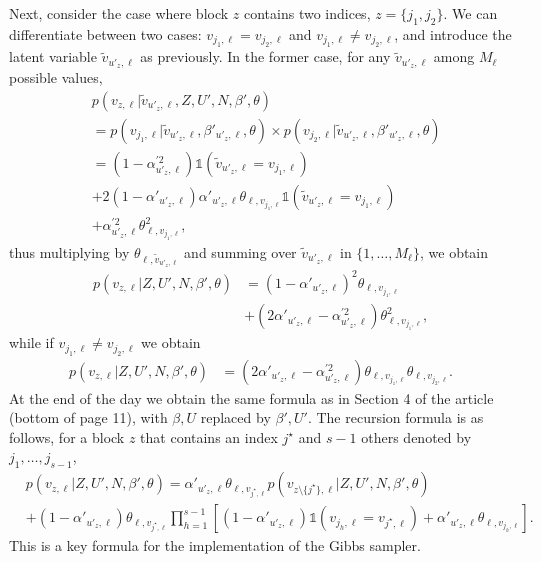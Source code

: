 \documentclass[ba]{imsart}
\begin{document}
Next, consider the case where block $z$ contains
two indices, $z = \{j_1,j_2\}$.
We can differentiate between two cases: $v_{j_1,\ell} = v_{j_2,\ell}$ and  
$v_{j_1,\ell} \neq v_{j_2,\ell}$, and introduce the latent variable $\tilde{v}_{u'_z,\ell}$ as previously. 
In the former case, for any $\tilde{v}_{u'_z,\ell}$ among $M_\ell$ possible values,
\begin{align*}
    &p(v_{z,\ell}|\tilde{v}_{u'_z,\ell},Z,U',N,\beta',\theta)\\
    &= p(v_{j_1,\ell}|\tilde{v}_{u'_z,\ell},\beta'_{u'_z,\ell},\theta)
    \times p(v_{j_2,\ell}|\tilde{v}_{u'_z,\ell},\beta'_{u'_z,\ell},\theta)\\
    &= (1-\alpha^{'2}_{u'_z,\ell}) \mathds{1}(\tilde{v}_{u'_z,\ell} = v_{j_1,\ell}) \\
    &+ 2 (1-\alpha'_{u'_z,\ell}) \alpha'_{u'_z,\ell} \theta_{\ell, v_{j_1,\ell}} \mathds{1}(\tilde{v}_{u'_z,\ell} = v_{j_1,\ell}) \\ 
    &+ \alpha^{'2}_{u'_z,\ell} \theta_{\ell, v_{j_1,\ell}}^2,
\end{align*}
thus multiplying by $\theta_{\ell,\tilde{v}_{u'_z,\ell}}$ and summing over $\tilde{v}_{u'_z,\ell}$ in $\{1,\ldots,M_\ell\}$, we obtain
\begin{align*}
p(v_{z,\ell}|Z,U',N,\beta',\theta) &= (1-\alpha'_{u'_z,\ell})^2 \theta_{\ell,v_{j_1,\ell}} \\ 
&+ (2\alpha'_{u'_z,\ell}-\alpha^{'2}_{u'_z,\ell}) \theta_{\ell, v_{j_1,\ell}}^2,
\end{align*}
while if $v_{j_1,\ell} \neq v_{j_2,\ell}$ we obtain 
\begin{align*}
p(v_{z,\ell}|Z,U',N,\beta',\theta) &=
(2\alpha'_{u'_z,\ell}-\alpha^{'2}_{u'_z,\ell}) \theta_{\ell, v_{j_1,\ell}}\theta_{\ell, v_{j_2,\ell}}.
\end{align*}
At the end of the day we obtain the same formula as in Section 4 of the article (bottom of page 11),
with $\beta,U$ replaced by $\beta',U'$. The recursion formula is as follows,
for a block $z$ that contains an index $j^\star$ and $s-1$ others denoted by $j_1,\ldots,j_{s-1}$,
\begin{equation}
    \label{eq:recursion}
    \begin{split}
        &p(v_{z,\ell}|Z,U',N,\beta',\theta) =
        \alpha'_{u'_z, \ell} \theta_{\ell, v_{j^\star,\ell}}
        p(v_{z\setminus\{j^\star\}, \ell}|Z,U',N,\beta', \theta) \\
        &+ (1-\alpha'_{u'_z, \ell}) \theta_{\ell,v_{j^\star,\ell}} 
        \prod_{h=1}^{s-1} \left[ (1-\alpha'_{u'_z, \ell})\mathds{1}(v_{j_h,\ell}=v_{j^\star,\ell}) + \alpha'_{u'_z, \ell} \theta_{\ell,v_{j_h,\ell}}\right].
    \end{split}
\end{equation}
This is a key formula for the implementation
of the Gibbs sampler.
\end{document}
